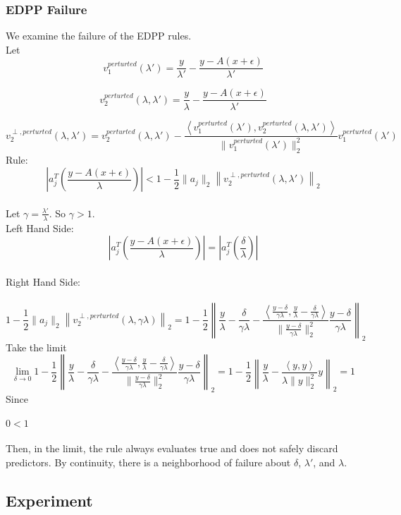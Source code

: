 \documentclass{article}
\begin{document}
\subsubsection*{EDPP Failure}

We examine the failure of the EDPP rules.\\
Let
$$
v_1^{perturted}(\lambda') = \frac{y}{\lambda'} - \frac{y-A(x+\epsilon)}{\lambda'}
$$

$$
v_2^{perturted}(\lambda,\lambda') = \frac{y}{\lambda} - \frac{y-A(x+\epsilon)}{\lambda'}
$$

$$
v_2^{\perp,perturted}(\lambda,\lambda') = v_2^{perturted}(\lambda,\lambda') - \frac{\left<v_1^{perturted}(\lambda'),v_2^{perturted}(\lambda,\lambda')\right>}{\|v_1^{perturted}(\lambda')\|^2_2} v_1^{perturted}(\lambda')
$$
Rule:
$$
\left|a_j^T \left(\frac{y - A(x+\epsilon)}{\lambda}\right)\right| < 1 - \frac 12 \|a_j\|_2 \left\| v_2^{\perp,perturted}(\lambda,\lambda') \right\|_2
$$
\\
Let $\gamma = \frac {\lambda'}{\lambda}$. So $\gamma>1$.\\
Left Hand Side:
$$
\left|a_j^T \left(\frac{y - A(x+\epsilon)}{\lambda}\right)\right| = \left|a_j^T \left(\frac{\delta}{\lambda}\right)\right| 
$$
\\
Right Hand Side: \\
\\
$$
1 - \frac 12 \|a_j\|_2 \left\| v_2^{\perp,perturted}(\lambda,\gamma\lambda) \right\|_2 
= 1 - \frac 12 \left\| \frac y\lambda - \frac {\delta}{\gamma\lambda} - \frac {\left<\frac{y-\delta}{\gamma\lambda},\frac{y}{\lambda}-\frac{\delta}{\gamma\lambda}\right>}{\|\frac{y-\delta}{\gamma\lambda}\|_2^2}  \frac{y-\delta}{\gamma\lambda}  \right\|_2
$$
Take the limit
$$
\lim_{\delta\rightarrow 0} 1 - \frac 12 \left\| \frac y\lambda - \frac {\delta}{\gamma\lambda} - \frac {\left<\frac{y-\delta}{\gamma\lambda},\frac{y}{\lambda}-\frac{\delta}{\gamma\lambda}\right>}{\|\frac{y-\delta}{\gamma\lambda}\|_2^2}  \frac{y-\delta}{\gamma\lambda}  \right\|_2 
= 1 - \frac 12 \left\| \frac y\lambda - \frac {\left<y,y\right>}{\lambda\|y\|_2^2}  y  \right\|_2=1
$$
Since\\
\\
$0<1$\\
\\
Then, in the limit, the rule always evaluates true and does not safely discard predictors. By continuity, there is a neighborhood of failure about $\delta$, $\lambda'$, and $\lambda$.

\subsection*{Experiment}
\end{document}
